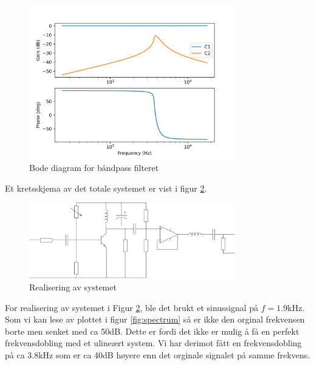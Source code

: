 \begin{figure}[!h]
\centering
\includegraphics[width=0.8\textwidth]{Bilder/bode.png}
\caption{Bode diagram for båndpass filteret}
\label{fig:bode_diagram}
\end{figure}

Et kretsskjema av det totale systemet er vist i figur \ref{fig:realisert_system_skjema}.

\begin{figure}[!h]
\centering
\includegraphics[width=0.8\textwidth]{Bilder/Realisert_system_skjema.drawio.png}
\caption{Realisering av systemet}
\label{fig:realisert_system_skjema}
\end{figure}


For realisering av systemet i Figur \ref{fig:realisert_system_skjema}, ble det brukt et sinussignal på $f = 1.9$kHz. Som vi kan lese av plottet i figur \ref{fig:spectrum} så er ikke den orginal frekvensen borte men senket med ca 50dB. Dette er fordi det ikke er mulig å få en perfekt frekvensdobling med et ulineært system. Vi har derimot fått en frekvensdobling på ca 3.8kHz som er ca 40dB høyere enn det orginale signalet på samme frekvens. 


